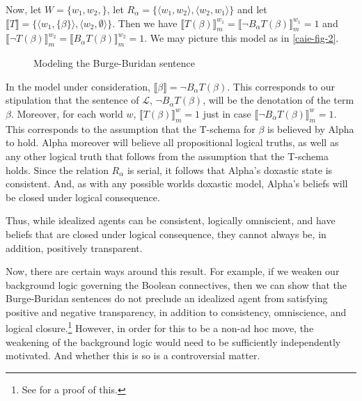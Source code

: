 Now, let $W = \{w_1 , w_2, \}$, let $R_\alpha = \{ \langle w_1, w_2 \rangle, \langle w_2, w_1 \rangle \}$ and let $\llbracket T \rrbracket = \{ \langle w_1, \{  \beta  \} \rangle, \langle w_2, \emptyset \rangle \}$.
Then we have $\llbracket T(\beta) \rrbracket^{w_1}_m = \llbracket \lnot B_\alpha T(\beta) \rrbracket^{w_1}_m = 1$ and $\llbracket \lnot T(\beta) \rrbracket^{w_2}_m = \llbracket B_\alpha T(\beta) \rrbracket^{w_2}_m = 1$.
We may picture this model as in \autoref{caie-fig-2}.
\begin{figure}
\centering
{}
\caption{Modeling the Burge-Buridan sentence}\label{caie-fig-2}
\end{figure}

 
In the model under consideration, $\llbracket  \beta  \rrbracket = \lnot B_\alpha T(\beta)$.
This corresponds to our stipulation that the sentence of $\mathcal{L}$, $\lnot B_\alpha T(\beta)$, will be the denotation of the term $\beta$.
Moreover, for each world $w$, $\llbracket T(\beta) \rrbracket^w_m = 1$ just in case $\llbracket \lnot B_\alpha T(\beta) \rrbracket^w_m = 1$.
This corresponds to the assumption that the T-schema for $\beta$ is believed by Alpha to hold.
Alpha moreover will believe all propositional logical truths, as well as any other logical truth that follows from the assumption that the T-schema holds.
Since the relation $R_\alpha$ is serial, it follows that Alpha's doxastic state is consistent.
And, as with any possible worlds doxastic model, Alpha's beliefs will be closed under logical consequence.

Thus, while idealized agents can be consistent, logically omniscient, and have beliefs that are closed under logical consequence, they cannot always be, in addition, positively transparent.

Now, there are certain ways around this result.
For example, if we weaken our background logic governing the Boolean connectives,  then we can show that the Burge-Buridan sentences do not preclude an idealized agent from satisfying positive and negative transparency, in addition to consistency, omniscience, and logical closure.\footnote{See \citet{Caie2} for a proof of this.}
However, in order for this to be a non-ad hoc move, the weakening of the background logic would need to be sufficiently independently motivated. 
And whether this is so is a controversial matter.

